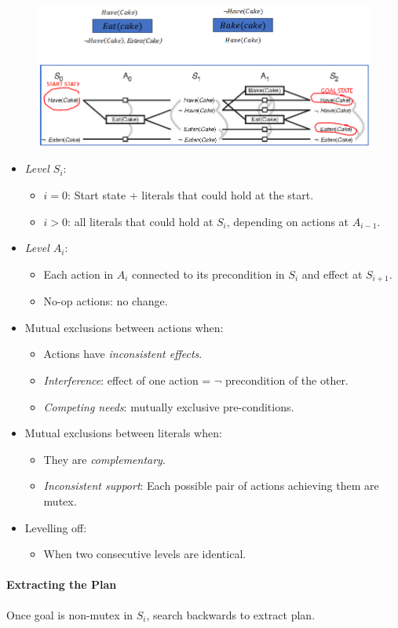 \documentclass[twocolumn,english]{article}
\begin{document}
\begin{figure}[H]
\centering{}\includegraphics[width=0.9\columnwidth]{img/graph-plan}
\end{figure}
\begin{itemize}
\item \emph{Level $S_{i}$}:
\begin{itemize}
\item $i=0$: Start state + literals that could hold at the start.
\item $i>0$: all literals that could hold at $S_{i}$, depending on actions
at $A_{i-1}$.
\end{itemize}
\item \emph{Level $A_{i}$}:
\begin{itemize}
\item Each action in $A_{i}$ connected to its precondition in $S_{i}$
and effect at $S_{i+1}$.
\item No-op actions: no change.
\end{itemize}
\item Mutual exclusions between actions when:
\begin{itemize}
\item Actions have \emph{inconsistent effects}.
\item \emph{Interference}: effect of one action = $\lnot$ precondition
of the other.
\item \emph{Competing needs}: mutually exclusive pre-conditions.
\end{itemize}
\item Mutual exclusions between literals when:
\begin{itemize}
\item They are \emph{complementary}.
\item \emph{Inconsistent support}: Each possible pair of actions achieving
them are mutex.
\end{itemize}
\item Levelling off:
\begin{itemize}
\item When two consecutive levels are identical.
\end{itemize}
\end{itemize}

\paragraph{Extracting the Plan}

Once goal is non-mutex in $S_{i}$, search backwards to extract plan.
\end{document}
